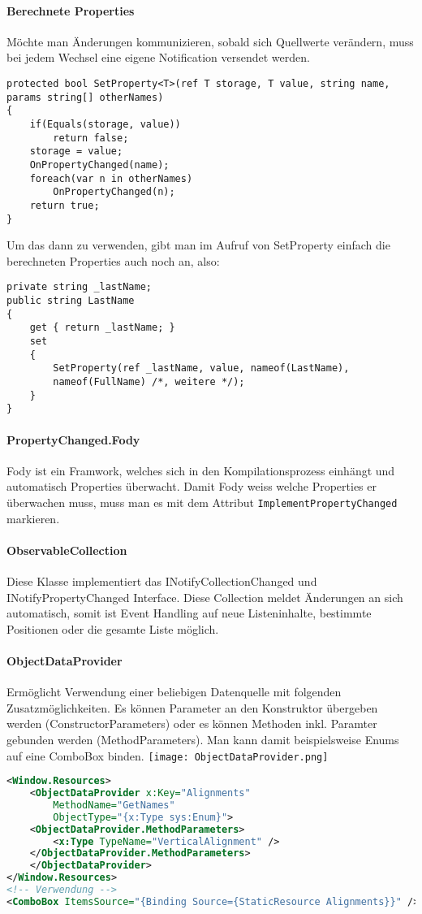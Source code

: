 \paragraph{Berechnete Properties} Möchte man Änderungen kommunizieren, sobald sich Quellwerte verändern, muss bei jedem Wechsel eine eigene Notification versendet werden. 
\begin{lstlisting}
protected bool SetProperty<T>(ref T storage, T value, string name, params string[] otherNames)
{
    if(Equals(storage, value))
        return false;
    storage = value;
    OnPropertyChanged(name);
    foreach(var n in otherNames)
        OnPropertyChanged(n);
    return true;
}
\end{lstlisting}

Um das dann zu verwenden, gibt man im Aufruf von SetProperty einfach die berechneten Properties auch noch an, also:
\begin{lstlisting}
private string _lastName;
public string LastName
{
    get { return _lastName; }
    set
    {
        SetProperty(ref _lastName, value, nameof(LastName), 
        nameof(FullName) /*, weitere */);
    }
}
\end{lstlisting}
\paragraph{PropertyChanged.Fody} Fody ist ein Framwork, welches sich in den Kompilationsprozess einhängt und automatisch Properties überwacht. Damit Fody weiss welche Properties er überwachen muss, muss man es mit dem Attribut \verb+ImplementPropertyChanged+ markieren. 
\paragraph{ObservableCollection} Diese Klasse implementiert das INotifyCollectionChanged und INotifyPropertyChanged Interface. Diese Collection meldet Änderungen an sich automatisch, somit ist Event Handling auf neue Listeninhalte, bestimmte Positionen oder die gesamte Liste möglich.
\paragraph{ObjectDataProvider} Ermöglicht Verwendung einer beliebigen Datenquelle mit folgenden Zusatzmöglichkeiten. Es können Parameter an den Konstruktor übergeben werden (ConstructorParameters) oder es können Methoden inkl. Paramter gebunden werden (MethodParameters). Man kann damit beispielsweise Enums auf eine ComboBox binden.
\texttt{[image: ObjectDataProvider.png]}
\begin{lstlisting}[language=xml]
<Window.Resources>
    <ObjectDataProvider x:Key="Alignments"
        MethodName="GetNames"
        ObjectType="{x:Type sys:Enum}">
    <ObjectDataProvider.MethodParameters>
        <x:Type TypeName="VerticalAlignment" />
    </ObjectDataProvider.MethodParameters>
    </ObjectDataProvider>
</Window.Resources>
<!-- Verwendung -->
<ComboBox ItemsSource="{Binding Source={StaticResource Alignments}}" />
\end{lstlisting}
